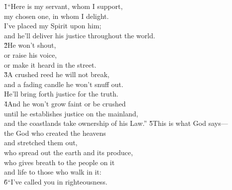 \begin{poetry}
\poeml {}
\v{1}``Here is my servant, whom I support, \\
\poemll    my chosen one, in whom I delight. \\
\poeml I've placed my Spirit upon him; \\
\poemll    and he'll deliver his justice throughout the world. \\
\poeml \v{2}He won't shout, \\
\poemll    or raise his voice, \\
\poemlll       or make it heard in the street. \\
\poeml \v{3}A crushed reed he will not break, \\
\poemll    and a fading candle he won't snuff out. \\
\poemlll       He'll bring forth justice for the truth. \\
\poeml \v{4}And he won't grow faint or be crushed \\
\poemll    until he establishes justice on the mainland, \\
\poemlll       and the coastlands take ownership of his Law.''
\poeml \v{5}This is what God says--- \\
\poemll    the God who created the heavens \\
\poemlll       and stretched them out, \\
\poeml who spread out the earth and its produce, \\
\poemll    who gives breath to the people on it \\
\poemlll       and life to those who walk in it: \\
\poeml \v{6}``I've called you in righteousness. \\

\end{poetry}
